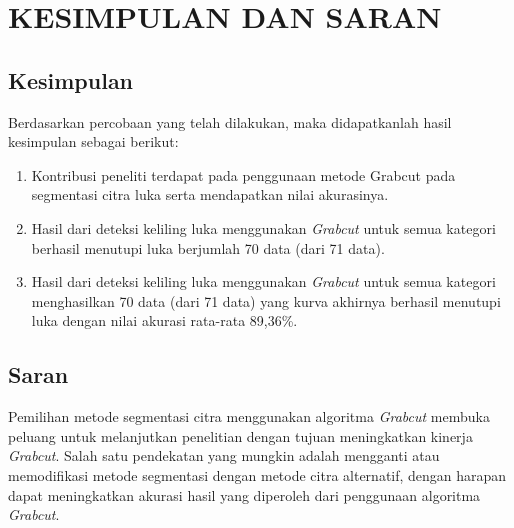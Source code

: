 
\chapter{KESIMPULAN DAN SARAN}

\section{Kesimpulan}
Berdasarkan percobaan yang telah dilakukan, maka didapatkanlah hasil kesimpulan sebagai berikut:
\begin{enumerate}

	\item Kontribusi peneliti terdapat pada penggunaan metode Grabcut pada 
	segmentasi 	citra luka serta mendapatkan nilai akurasinya.


	\item Hasil dari deteksi keliling luka menggunakan \emph{Grabcut} untuk semua kategori 
	berhasil menutupi luka berjumlah 70 data (dari 71 data).
	
	\item Hasil dari deteksi keliling luka menggunakan \emph{Grabcut} untuk semua 
	kategori menghasilkan 70 data (dari 71 data) yang kurva akhirnya berhasil 
	menutupi luka dengan nilai akurasi rata-rata 89,36\%.

\end{enumerate}

\section{Saran}
Pemilihan metode segmentasi citra menggunakan algoritma \emph{Grabcut} membuka peluang 
untuk melanjutkan penelitian dengan tujuan meningkatkan kinerja \emph{Grabcut}. 
Salah satu pendekatan yang mungkin adalah mengganti atau memodifikasi metode 
segmentasi dengan metode citra alternatif, dengan harapan dapat meningkatkan 
akurasi hasil yang diperoleh dari penggunaan algoritma \emph{Grabcut}.

\begin{comment}

\end{comment}